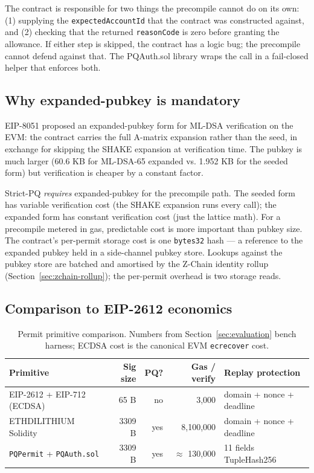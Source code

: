 The contract is responsible for two things the precompile cannot do on its
own: (1) supplying the \texttt{expectedAccountId} that the contract was
constructed against, and (2) checking that the returned
\texttt{reasonCode} is zero before granting the allowance. If either step
is skipped, the contract has a logic bug; the precompile cannot defend
against that. The PQAuth.sol library wraps the call in a fail-closed
helper that enforces both.

\subsection{Why expanded-pubkey is mandatory}

EIP-8051 \cite{eip8051} proposed an expanded-pubkey form for ML-DSA
verification on the EVM: the contract carries the full A-matrix expansion
rather than the seed, in exchange for skipping the SHAKE expansion at
verification time. The pubkey is much larger (60.6 KB for ML-DSA-65 expanded
vs. 1.952 KB for the seeded form) but verification is cheaper by a constant
factor.

Strict-PQ \emph{requires} expanded-pubkey for the precompile path. The
seeded form has variable verification cost (the SHAKE expansion runs every
call); the expanded form has constant verification cost (just the lattice
math). For a precompile metered in gas, predictable cost is more important
than pubkey size. The contract's per-permit storage cost is one
\texttt{bytes32} hash --- a reference to the expanded pubkey held in a
side-channel pubkey store. Lookups against the pubkey store are batched and
amortised by the Z-Chain identity rollup
(Section~\ref{sec:zchain-rollup}); the per-permit overhead is two storage
reads.

\subsection{Comparison to EIP-2612 economics}

\begin{table}[H]
\centering
\caption{Permit primitive comparison. Numbers from
Section~\ref{sec:evaluation} bench harness; ECDSA cost is the canonical EVM
\texttt{ecrecover} cost.}
\label{tab:permit-econ}
\begin{tabular}{lrrrl}
\toprule
Primitive & Sig size & PQ? & Gas / verify & Replay protection \\
\midrule
EIP-2612 + EIP-712 (ECDSA) & 65 B   & no  & 3{,}000    & domain + nonce + deadline \\
ETHDILITHIUM Solidity      & 3309 B & yes & 8{,}100{,}000 & domain + nonce + deadline \\
\texttt{PQPermit} + \texttt{PQAuth.sol} & 3309 B & yes & $\approx$ 130{,}000   & 11 fields TupleHash256 \\
\bottomrule
\end{tabular}
\end{table}

